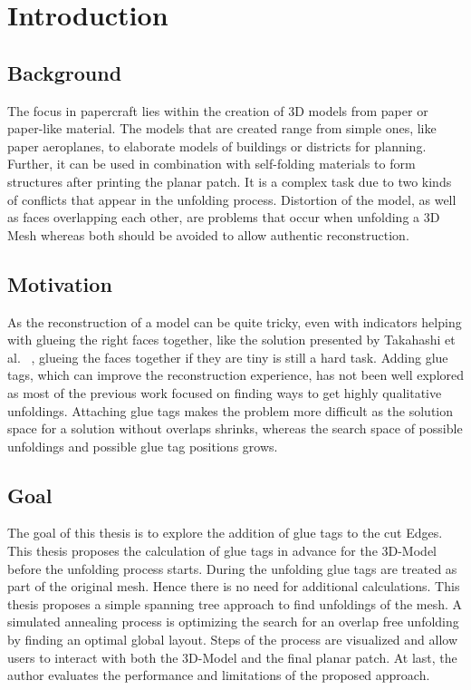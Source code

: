 \documentclass[draft,final]{vutinfth} %
\begin{document}
\tableofcontents %

\mainmatter

\chapter{Introduction}

\section{Background}
The focus in papercraft lies within the creation of 3D models from paper or paper-like material. The models that are created range from simple ones, like paper aeroplanes, to elaborate models of buildings or districts for planning. Further, it can be used in combination with self-folding materials to form structures after printing the planar patch. It is a complex task due to two kinds of conflicts that appear in the unfolding process. Distortion of the model, as well as faces overlapping each other, are problems that occur when unfolding a 3D Mesh whereas both should be avoided to allow authentic reconstruction.

\section{Motivation}
As the reconstruction of a model can be quite tricky, even with indicators helping with glueing the right faces together, like the solution presented by Takahashi et al.
~\cite{takahashi2011optimized}, glueing the faces together if they are tiny is still a hard task.
Adding glue tags, which can improve the reconstruction experience, has not been well explored as most of the previous work focused on finding ways to get highly qualitative unfoldings. Attaching glue tags makes the problem more difficult as the solution space for a solution without overlaps shrinks, whereas the search space of possible unfoldings and possible glue tag positions grows.

\section{Goal}
The goal of this thesis is to explore the addition of glue tags to the cut Edges. This thesis proposes the calculation of glue tags in advance for the 3D-Model before the unfolding process starts. During the unfolding glue tags are treated as part of the original mesh. Hence there is no need for additional calculations. This thesis proposes a simple spanning tree approach to find unfoldings of the mesh. A simulated annealing process is optimizing the search for an overlap free unfolding by finding an optimal global layout. Steps of the process are visualized and allow users to interact with both the 3D-Model and the final planar patch. At last, the author evaluates the performance and limitations of the proposed approach.
\end{document}
